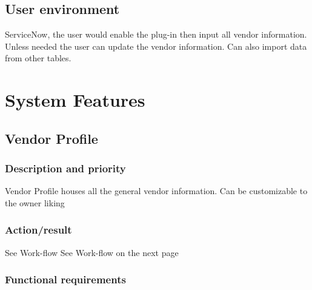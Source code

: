 \documentclass[10pt]{article}
\begin{document}
\subsection{User environment}

ServiceNow, the user would enable the plug-in then input all vendor information. Unless needed the user can update the vendor information. Can also import data from other tables. 











\section{System Features}

\subsection{Vendor Profile}

\subsubsection{Description and priority}

Vendor Profile houses all the general vendor information. Can be customizable to the owner liking

\subsubsection{Action/result}

See Work-flow See Work-flow on the next page



\subsubsection{ Functional requirements}
\end{document}
